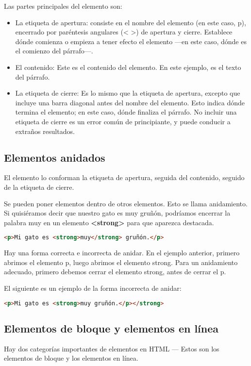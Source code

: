 Las partes principales del elemento son:

\begin{itemize}
	\item La etiqueta de apertura: consiste en el nombre del elemento (en este caso, p), encerrado por paréntesis angulares (< >) de apertura y cierre. Establece dónde comienza o empieza a tener efecto el elemento —en este caso, dónde es el comienzo del párrafo—.
	\item El contenido: Este es el contenido del elemento. En este ejemplo, es el texto del párrafo.
	\item La etiqueta de cierre: Es lo mismo que la etiqueta de apertura, excepto que incluye una barra diagonal antes del nombre del elemento. Esto indica dónde termina el elemento; en este caso, dónde finaliza el párrafo. No incluir una etiqueta de cierre es un error común de principiante, y puede conducir a extraños resultados.
\end{itemize}

\subsection{Elementos anidados}

El elemento lo conforman la etiqueta de apertura, seguida del contenido, seguido de la etiqueta de cierre.

Se pueden poner elementos dentro de otros elementos. Esto se llama anidamiento. Si quisiéramos decir que nuestro gato es muy gruñón, podríamos encerrar la palabra muy en un elemento\textbf{ <strong>} para que aparezca destacada.

\begin{lstlisting}[language=html]
<p>Mi gato es <strong>muy</strong> gruñón.</p>
\end{lstlisting}

Hay una forma correcta e incorrecta de anidar. En el ejemplo anterior, primero abrimos el elemento p, luego abrimos el elemento strong. Para un anidamiento adecuado, primero debemos cerrar el elemento strong, antes de cerrar el p.

El siguiente es un ejemplo de la forma incorrecta de anidar:

\begin{lstlisting}[language=HTML]
<p>Mi gato es <strong>muy gruñón.</p></strong>
\end{lstlisting}

\subsection{Elementos de bloque y elementos en línea}
Hay dos categorías importantes de elementos en HTML — Estos son los elementos de bloque y los elementos en línea.

